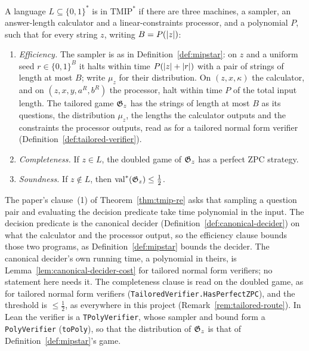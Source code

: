 \begin{definition}
\label{def:tmipstar-poly}
\leanok
A language $L \subseteq \{0,1\}^*$ is in $\mathrm{TMIP}^*$ if there are three machines, a
sampler, an answer-length calculator and a linear-constraints processor, and a polynomial $P$,
such that for every string $z$, writing $B = P(\left\vert {z} \right\vert)$:
\begin{enumerate}
\item \emph{Efficiency.} The sampler is as in Definition~\ref{def:mipstar}: on $z$ and a uniform
  seed $r \in \{0,1\}^B$ it halts within time $P(\left\vert {z} \right\vert + \left\vert {r} \right\vert)$ with a pair of strings of
  length at most $B$; write $\mu_z$ for their distribution. On $(z, x, \kappa)$ the calculator,
  and on $(z, x, y, a^R, b^R)$ the processor, halt within time $P$ of the total input length.
  The tailored game $\mathfrak{G}_z$ has the strings of length at most $B$ as its questions, the
  distribution $\mu_z$, the lengths the calculator outputs and the constraints the processor
  outputs, read as for a tailored normal form verifier (Definition~\ref{def:tailored-verifier}).
\item \emph{Completeness.} If $z \in L$, the doubled game of $\mathfrak{G}_z$ has a perfect ZPC
  strategy.
\item \emph{Soundness.} If $z \notin L$, then $\mathrm{val}^*(\mathfrak{G}_z) \leq \frac12$.
\end{enumerate}
\end{definition}

The paper's clause~(1) of Theorem~\ref{thm:tmip-re} asks that sampling a question pair and
evaluating the decision predicate take time polynomial in the input. The decision predicate is
the canonical decider (Definition~\ref{def:canonical-decider}) on what the calculator and the
processor output, so the efficiency clause bounds those two programs, as
Definition~\ref{def:mipstar} bounds the decider. The canonical decider's own running time, a
polynomial in theirs, is Lemma~\ref{lem:canonical-decider-cost} for tailored normal form
verifiers; no statement here needs it. The
completeness clause is read on the doubled game, as for tailored normal form verifiers
(\texttt{TailoredVerifier.HasPerfectZPC}), and the threshold is $\leq \frac12$, as everywhere
in this project (Remark~\ref{rem:tailored-route}). In Lean the verifier is a
\texttt{TPolyVerifier}, whose sampler and bound form a \texttt{PolyVerifier}
(\texttt{toPoly}), so that the distribution of $\mathfrak{G}_z$ is that of
Definition~\ref{def:mipstar}'s game.

